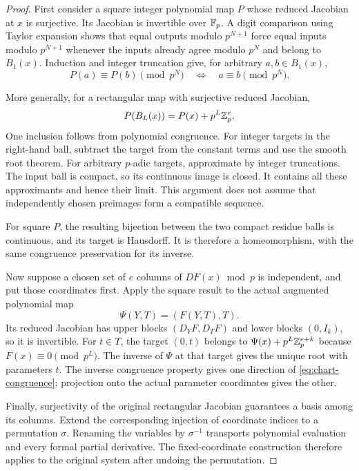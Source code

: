 \begin{proof}
First consider a square integer polynomial map $P$ whose reduced Jacobian
at $x$ is surjective. Its Jacobian is invertible over $\mathbb F_p$. A digit
comparison using Taylor expansion shows that equal outputs modulo
$p^{N+1}$ force equal inputs modulo $p^{N+1}$ whenever the inputs already
agree modulo $p^N$ and belong to $B_1(x)$. Induction and integer truncation
give, for arbitrary $a,b\in B_1(x)$,
\[
 P(a)\equiv P(b)\pmod{p^N}
 \quad\Longleftrightarrow\quad a\equiv b\pmod{p^N}.
\]

More generally, for a rectangular map with surjective reduced Jacobian,
\begin{equation}\label{eq:polynomial-ball-image}
 P(B_L(x))=P(x)+p^L\mathbb Z_p^e.
\end{equation}
One inclusion follows from polynomial congruence. For integer targets in
the right-hand ball, subtract the target from the constant terms and use
the smooth root theorem. For arbitrary $p$-adic targets, approximate by
integer truncations. The input ball is compact, so its continuous image is
closed. It contains all these approximants and hence their limit. This
argument does not assume that independently chosen preimages form a
compatible sequence.

For square $P$, the resulting bijection between the two compact residue
balls is continuous, and its target is Hausdorff. It is therefore a
homeomorphism, with the same congruence preservation for its inverse.

Now suppose a chosen set of $e$ columns of $DF(x)\bmod p$ is independent,
and put those coordinates first. Apply the square result to the actual
augmented polynomial map
\[
 \Psi(Y,T)=(F(Y,T),T).
\]
Its reduced Jacobian has upper blocks $(D_YF,D_TF)$ and lower blocks
$(0,I_k)$, so it is invertible. For $t\in T$, the target $(0,t)$ belongs
to $\Psi(x)+p^L\mathbb Z_p^{e+k}$ because $F(x)\equiv0\pmod{p^L}$.
The inverse of $\Psi$ at that target gives the unique root with parameters
$t$. The inverse congruence property gives one direction of
\eqref{eq:chart-congruence}; projection onto the actual parameter
coordinates gives the other.

Finally, surjectivity of the original rectangular Jacobian guarantees a
basis among its columns. Extend the corresponding injection of coordinate
indices to a permutation $\sigma$. Renaming the variables by
$\sigma^{-1}$ transports polynomial evaluation and every formal partial
derivative. The fixed-coordinate construction therefore applies to the
original system after undoing the permutation.
\end{proof}

